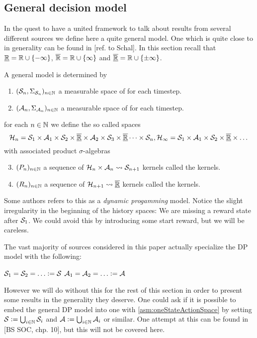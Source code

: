 
\subsection{General decision model}
In the quest to have a united framework to talk about results from
several different sources we define here a quite general model.
One which is quite close to in generality can be found in
[ref. to Schal].
In this section recall that $\underline{\mathbb{R}} = \mathbb{R} \cup \{-\infty\}$,
$\overline{\mathbb{R}} = \mathbb{R} \cup \{\infty\}$ and
$\overline{\underline{\mathbb{R}}} = \mathbb{R} \cup \{\pm \infty\}$.

\begin{defn}
  A general  model is determined by
  \begin{enumerate}
    \item $(\mathcal{S}_n, \Sigma_{\mathcal{S}_n})_{n \in \mathbb{N}}$ a 
      measurable space of  for each timestep.
    \item $(\mathcal{A}_n, \Sigma_{\mathcal{A}_n})_{n \in \mathbb{N}}$ a 
      measurable space of  for each timestep.
  \end{enumerate}
  for each $n \in \mathbb{N}$ we define the so called  spaces
  \[ \mathcal{H}_n = \mathcal{S}_1 \times \mathcal{A}_1
    \times \mathcal{S}_2 \times \overline{\underline{\mathbb{R}}} \times \mathcal{A}_2
    \times \mathcal{S}_3 \times \overline{\underline{\mathbb{R}}} \dots \times \mathcal{S}_n,
    \mathcal{H}_\infty = \mathcal{S}_1 \times \mathcal{A}_1 \times \mathcal{S}_2 \times
    \overline{\underline{\mathbb{R}}} \times \dots
  \]
  with associated product $\sigma$-algebras
  \begin{enumerate} \setcounter{enumi}{2}
    \item $(P_n)_{n \in \mathbb{N}}$ a sequence of
      $\mathcal{H}_n \times \mathcal{A}_n \leadsto \mathcal{S}_{n+1}$ kernels
      called the  kernels.
    \item $(R_n)_{n \in \mathbb{N}}$ a sequence of
      $\mathcal{H}_{n+1} \leadsto \overline{\underline{\mathbb{R}}}$ kernels
      called the  kernels.
  \end{enumerate}
  \label{sett:DM}
\end{defn}
Some authors refers to this as a \emph{dynamic progamming} model.
Notice the slight irregularity in the beginning of the history spaces:
We are missing a reward state after $\mathcal{S}_1$. We could avoid
this by introducing some start reward, but we will be careless.

The vast majority of sources considered in this paper actually specialize
the DP model with the following:
\begin{asm}
  $\Cal{S}_1 = \Cal{S}_2 = \dots \defeq \Cal{S}$
  $\Cal{A}_1 = \Cal{A}_2 = \dots \defeq \Cal{A}$
  \label{asm:oneStateActionSpace}
\end{asm}
However we will do without this for the rest of this section in order to
present some results in the generality they deserve.
One could ask if it is possible to embed the general DP model into one
with \cref{asm:oneStateActionSpace} by setting
$\mathcal{S} \vcentcolon= \bigcup_{i\in\mathbb{N}} \mathcal{S}_i$ and
$\mathcal{A} \vcentcolon= \bigcup_{i\in\mathbb{N}} \mathcal{A}_i$ or similar.
One attempt at this can be found in [BS SOC, chp. 10],
but this will not be covered here. %

